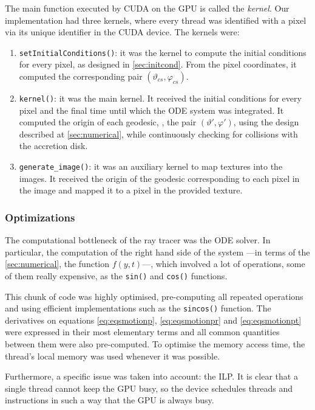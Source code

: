 The main function executed by \ac{CUDA} on the \ac{GPU} is called the \emph{kernel}. Our implementation had three kernels, where every thread was identified with a pixel via its unique identifier in the \ac{CUDA} device. The kernels were:
\begin{enumerate}
	\item \lstinline{setInitialConditions()}: it was the kernel to compute the initial conditions for every pixel, as designed in \autoref{sec:initcond}. From the pixel coordinates, it computed the corresponding pair $(\vartheta_{cs}, \varphi_{cs})$.
	\item  \lstinline{kernel()}: it was the main kernel. It received the initial conditions for every pixel and the final time until which the \ac{ODE} system was integrated. It computed the origin of each geodesic, \ie, the pair $(\vartheta', \varphi')$, using the design described at \autoref{sec:numerical}, while continuously checking for collisions with the accretion disk.
	\item \lstinline{generate_image()}: it was an auxiliary kernel to map textures into the images. It received the origin of the geodesic corresponding to each pixel in the image and mapped it to a pixel in the provided texture.
\end{enumerate}

\subsubsection*{Optimizations}

The computational bottleneck of the ray tracer was the \ac{ODE} solver. In particular, the computation of the right hand side of the system ---in terms of the \autoref{sec:numerical}, the function $f(y,t)$---, which involved a lot of operations, some of them really expensive, as the \lstinline{sin()} and \lstinline{cos()} functions.

This chunk of code was highly optimised, pre-computing all repeated operations and using efficient implementations such as the \lstinline{sincos()} function. The derivatives on equations \ref{eq:eqsmotionp}, \ref{eq:eqsmotionpr} and \ref{eq:eqsmotionpt} were expressed in their most elementary terms and all common quantities between them were also pre-computed. To optimise the memory access time, the thread's local memory was used whenever it was possible.

Furthermore, a specific issue was taken into account: the \ac{ILP}. It is clear that a single thread cannot keep the \ac{GPU} busy, so the device schedules threads and instructions in such a way that the \ac{GPU} is always busy.

